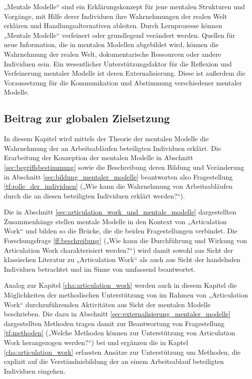 „Mentale Modelle“ sind ein Erklärungskonzept für jene mentalen Strukturen und Vorgänge, mit Hilfe derer Individuen ihre Wahrnehmungen der realen Welt erklären und Handlungsalternativen ableiten. Durch Lernprozesse können „Mentale Modelle“ verfeinert oder grundlegend verändert werden. Quellen für neue Information, die in mentalen Modellen abgebildet wird, können die Wahrnehmung der realen Welt, dokumentarische Ressourcen oder andere Individuen sein. Ein wesentlicher Unterstützungsfaktor für die Reflexion und Verfeinerung mentaler Modelle ist deren Externalisierung. Diese ist außerdem die Voraussetzung für die Kommunikation und Abstimmung verschiedener mentaler Modelle.

\subsection{Beitrag zur globalen Zielsetzung}
In diesem Kapitel wird mittels der Theorie der mentalen Modelle die Wahrnehmung der an Arbeitsabläufen beteiligten Individuen erklärt. Die Erarbeitung der Konzeption der mentalen Modelle in Abschnitt \ref{sec:begriffsbestimmung} sowie die Beschreibung deren Bildung und Veränderung in Abschnitt \ref{sec:bildung_mentaler_modelle} beantworten also Fragestellung \ref{tf:rolle_der_individuen} („Wie kann die Wahrnehmung von Arbeitsabläufen durch die an diesen beteiligten Individuen erklärt werden?“).

Die in Abschnitt \ref{sec:articulation_work_und_mentale_modelle} dargestellten Zusammenhänge stellen mentale Modelle in den Kontext von „Articulation Work“ und bilden so die Brücke, die die beiden Fragestellungen verbindet. Die Forschungsfrage \ref{ff:beschreibung} („Wie kann die Durchführung und Wirkung von Articulation Work charakterisiert werden?“) wird damit sowohl aus Sicht der klassischen Literatur zu „Articulation Work“ als auch aus Sicht der handelnden Individuen betrachtet und im Sinne von \citet{Grudin88} umfassend beantwortet.

Analog zur Kapitel \ref{cha:articulation_work} werden auch in diesem Kapitel die Möglichkeiten der methodischen Unterstützung von im Rahmen von „Articulation Work“ durchzuführenden Aktivitäten aus Sicht der mentalen Modelle beschrieben. Die dazu in Abschnitt \ref{sec:externalisierung_mentaler_modelle} dargestellten Methoden tragen damit zur Beantwortung von Fragestellung \ref{tf:methoden} („Welche Methoden können zur Unterstützung von Articulation Work herangezogen werden?“) bei und ergänzen die in Kaptel \ref{cha:articulation_work} erfassten Ansätze zur Unterstützung um Methoden, die explizit auf die Verständnisbildung der an einem Arbeitsablauf beteiligten Individuen eingehen.

